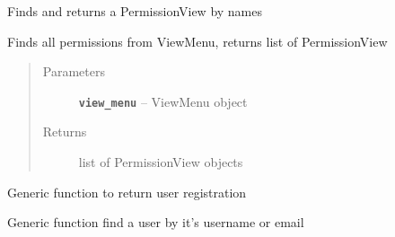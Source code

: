 \documentclass[letterpaper,10pt,english]{sphinxmanual}
\begin{document}
\begin{fulllineitems}
\begin{fulllineitems}
\label{api:flask.ext.appbuilder.security.manager.BaseSecurityManager.find_permission_view_menu}
Finds and returns a PermissionView by names

\end{fulllineitems}


\begin{fulllineitems}
\label{api:flask.ext.appbuilder.security.manager.BaseSecurityManager.find_permissions_view_menu}
Finds all permissions from ViewMenu, returns list of PermissionView
\begin{quote}\begin{description}
\item[{Parameters}] \leavevmode
\textbf{\texttt{view\_menu}} -- ViewMenu object

\item[{Returns}] \leavevmode
list of PermissionView objects

\end{description}\end{quote}

\end{fulllineitems}


\begin{fulllineitems}
\label{api:flask.ext.appbuilder.security.manager.BaseSecurityManager.find_register_user}
Generic function to return user registration

\end{fulllineitems}


\begin{fulllineitems}
\label{api:flask.ext.appbuilder.security.manager.BaseSecurityManager.find_user}
Generic function find a user by it's username or email


\end{fulllineitems}
\end{fulllineitems}
\end{document}
